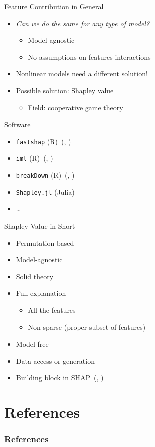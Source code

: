 \documentclass[dvipsnames]{beamer}
\renewcommand{\cite}[1]{(\citeauthor{#1}, \citeyear{#1})}
\newcommand{\red}[1]{{\color{red} #1}}
\begin{document}


\begin{frame}{Feature Contribution in General}
	\begin{itemize}
		\item \emph{Can we do the same for any type of model?}
		\begin{itemize}
			\item Model-agnostic
			\item No assumptions on features interactions
		\end{itemize}
		\item \red{Nonlinear models need a different solution!}
		\item Possible solution: \underline{Shapley value}
		\begin{itemize}
			\item Field: cooperative game theory
		\end{itemize}
	\end{itemize}
\end{frame}





\begin{frame}[fragile]{Software}
	\begin{itemize}
		\item \verb|fastshap| (R)~\cite{jethani2021fastshap}
		\item \verb|iml| (R)~\cite{molnar2018iml}
		\item \verb|breakDown| (R)~\cite{staniak2018explanations}
		\item \verb|Shapley.jl| (Julia)~\footnotemark
		\item \dots
	\end{itemize}
\end{frame}

\begin{frame}{Shapley Value in Short}
	\begin{itemize}
		\item Permutation-based
		\item Model-agnostic
		\item Solid theory
		\item Full-explanation
		\begin{itemize}
			\item All the features
			\item Non sparse (proper subset of features)
		\end{itemize}
		\item Model-free
		\item Data access or generation
		\item Building block in SHAP~\cite{lundberg2017unified}
	\end{itemize}
\end{frame}

\section{References}
\begin{frame}[allowframebreaks]
\frametitle{References}
\printbibliography
\end{frame}
\end{document}

